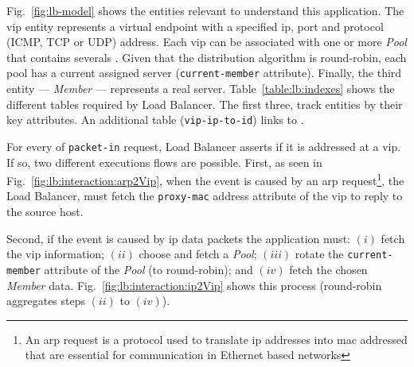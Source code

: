 Fig.~\ref{fig:lb-model} shows the entities relevant to understand this application. 
The \gls{vip} entity represents a virtual endpoint with a specified \gls{ip}, port and protocol (ICMP, TCP or UDP) address. 
Each \gls{vip} can be associated with one or more \emph{Pool} that contains severals . Given that the distribution algorithm is round-robin, each pool has a current assigned server (\texttt{current-member} attribute). Finally, the third entity --- \emph{Member} --- represents a real server. 
Table~\ref{table:lb:indexes} shows the different tables required by  Load Balancer.
The first three, track entities by their key attributes. An additional table (\texttt{vip-ip-to-id})  links   to . 

\begin{figure}[ht]
\TopFloatBoxes
\begin{floatrow}


\end{floatrow}
\end{figure}

For every \gls{of} \texttt{packet-in} request, Load Balancer asserts if it is addressed at a \gls{vip}. If so, two different executions flows are possible. First, as seen in Fig.~\ref{fig:lb:interaction:arp2Vip}, when the event is caused by an \gls{arp} request\footnote{An \gls{arp} request is a protocol used to translate \gls{ip} addresses into \gls{mac} addressed that are essential for communication in Ethernet based networks}, the Load Balancer, must fetch the \texttt{proxy-mac} address attribute of the \gls{vip} to reply to the source host.  

Second, if the event is caused by \gls{ip} data packets the application must: $(i)$ fetch the \gls{vip} information; $(ii)$ choose and fetch a \emph{Pool}; $(iii)$ rotate the \texttt{current-member} attribute of the \emph{Pool}  (to round-robin); and $(iv)$  fetch the chosen  \emph{Member}  data. Fig.~\ref{fig:lb:interaction:ip2Vip} shows this process (round-robin aggregates steps $(ii)$ to $(iv)$).  

